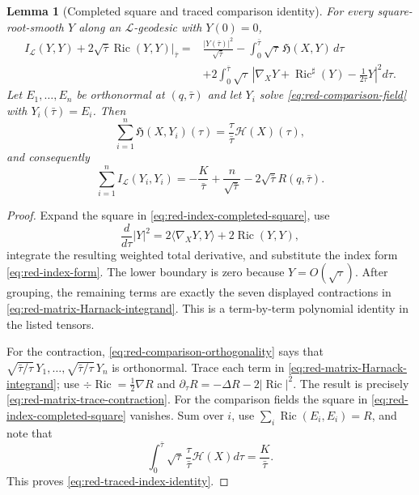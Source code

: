 \documentclass[10pt]{coll-l}
\newtheorem{lemma}[theorem]{Lemma}
\theoremstyle{definition}
\theoremstyle{remark}
\numberwithin{section}{chapter}
\numberwithin{equation}{chapter}
\newcommand{\Ric}{\operatorname{Ric}}
\begin{document}
\begin{lemma}[Completed square and traced comparison identity]
\label{lem:red-traced-index-identity}
For every square-root-smooth $Y$ along an $\mathcal L$-geodesic with
$Y(0)=0$,
\begin{align}
 I_{\mathcal L}(Y,Y)+2\sqrt{\bar\tau}\Ric(Y,Y)\big|_{\bar\tau}
={}&\frac{|Y(\bar\tau)|^2}{\sqrt{\bar\tau}}
 -\int_0^{\bar\tau}\sqrt\tau\,\mathfrak H(X,Y)\,d\tau       \label{eq:red-index-completed-square}\\
 &+2\int_0^{\bar\tau}\sqrt\tau\,
   \left|\nabla_XY+\Ric^\sharp(Y)-\frac1{2\tau}Y\right|^2d\tau.\nonumber
\end{align}
Let $E_1,\ldots,E_n$ be orthonormal at $(q,\bar\tau)$ and let $Y_i$ solve
\eqref{eq:red-comparison-field} with $Y_i(\bar\tau)=E_i$.  Then
\begin{equation}
 \sum_{i=1}^n\mathfrak H(X,Y_i)(\tau)
       =\frac\tau{\bar\tau}\mathcal H(X)(\tau),        \label{eq:red-matrix-trace-contraction}
\end{equation}
and consequently
\begin{equation}
 \sum_{i=1}^n I_{\mathcal L}(Y_i,Y_i)
       =-\frac K{\bar\tau}+\frac n{\sqrt{\bar\tau}}
              -2\sqrt{\bar\tau}R(q,\bar\tau).         \label{eq:red-traced-index-identity}
\end{equation}
\end{lemma}

\begin{proof}
Expand the square in \eqref{eq:red-index-completed-square}, use
\begin{equation}
 \frac d{d\tau}|Y|^2
       =2\langle\nabla_XY,Y\rangle+2\Ric(Y,Y),         \label{eq:red-Y-norm-derivative}
\end{equation}
integrate the resulting weighted total derivative, and substitute the index
form \eqref{eq:red-index-form}.  The lower boundary is zero because
$Y=O(\sqrt\tau)$.  After grouping, the remaining terms are exactly the seven
displayed contractions in \eqref{eq:red-matrix-Harnack-integrand}.  This is
a term-by-term polynomial identity in the listed tensors.

For the contraction, \eqref{eq:red-comparison-orthogonality} says that
$\sqrt{\bar\tau/\tau}\,Y_1,\ldots,
\sqrt{\bar\tau/\tau}\,Y_n$ is orthonormal.  Trace each term in
\eqref{eq:red-matrix-Harnack-integrand}; use
$\div\Ric=\frac12\nabla R$ and
$\partial_\tau R=-\Delta R-2|\Ric|^2$.  The result is precisely
\eqref{eq:red-matrix-trace-contraction}.  For the comparison fields the
square in \eqref{eq:red-index-completed-square} vanishes.  Sum over $i$,
use $\sum_i\Ric(E_i,E_i)=R$, and note that
\begin{equation}
 \int_0^{\bar\tau}\sqrt\tau\,
        \frac\tau{\bar\tau}\mathcal H(X)d\tau
       =\frac K{\bar\tau}.                              \label{eq:red-K-trace-integral}
\end{equation}
This proves \eqref{eq:red-traced-index-identity}.
\end{proof}
\end{document}
